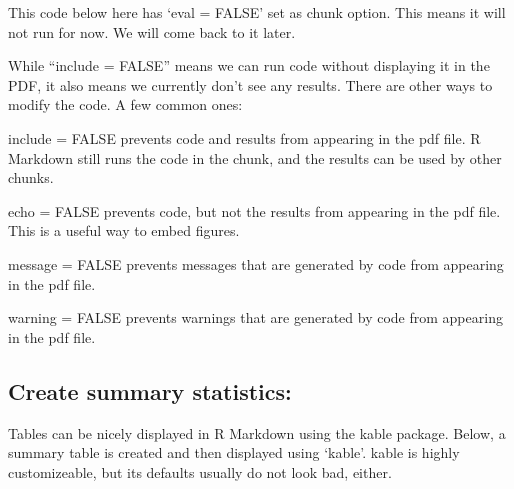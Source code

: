 \documentclass[
  12pt,
]{article}
\begin{document}
This code below here has `eval = FALSE' set as chunk option. This means
it will not run for now. We will come back to it later.

While ``include = FALSE'' means we can run code without displaying it in
the PDF, it also means we currently don't see any results. There are
other ways to modify the code. A few common ones:

include = FALSE prevents code and results from appearing in the pdf
file. R Markdown still runs the code in the chunk, and the results can
be used by other chunks.

echo = FALSE prevents code, but not the results from appearing in the
pdf file. This is a useful way to embed figures.

message = FALSE prevents messages that are generated by code from
appearing in the pdf file.

warning = FALSE prevents warnings that are generated by code from
appearing in the pdf file.

\subsection{Create summary statistics:}\label{create-summary-statistics}

Tables can be nicely displayed in R Markdown using the kable package.
Below, a summary table is created and then displayed using `kable'.
kable is highly customizeable, but its defaults usually do not look bad,
either.
\end{document}
